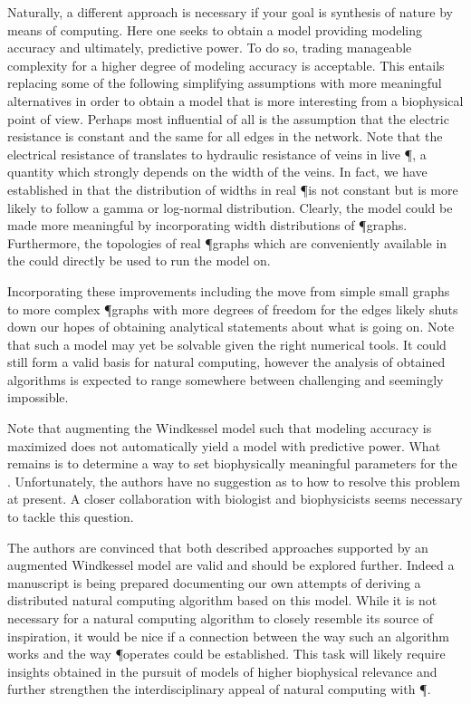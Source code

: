 	Naturally, a different approach is necessary if your goal is synthesis of nature by means of computing. Here one seeks to obtain a model providing modeling accuracy and ultimately, predictive power. To do so, trading manageable complexity for a higher degree of modeling accuracy is acceptable. This entails replacing some of the following simplifying assumptions with more meaningful alternatives in order to obtain a model that is more interesting from a biophysical point of view. Perhaps most influential of all is the assumption that the electric resistance is constant and the same for all edges in the network. Note that the electrical resistance of \Pes translates to hydraulic resistance of veins in live \P, a quantity which strongly depends on the width of the veins. In fact, we have established in  that the distribution of widths in real \P is not constant but is more likely to follow a gamma or log-normal distribution. Clearly, the model could be made more meaningful by incorporating width distributions of \P graphs. Furthermore, the topologies of real \P graphs which are conveniently available in the \SMGR could directly be used to run the model on.

	Incorporating these improvements including the move from simple small graphs to more complex \P graphs with more degrees of freedom for the edges likely shuts down our hopes of obtaining analytical statements about what is going on. Note that such a model may yet be solvable given the right numerical tools. It could still form a valid basis for natural computing, however the analysis of obtained algorithms is expected to range somewhere between challenging and seemingly impossible.

	Note that augmenting the Windkessel model such that modeling accuracy is maximized does not automatically yield a model with predictive power. What remains is to determine a way to set biophysically meaningful parameters for the \Pes. Unfortunately, the authors have no suggestion as to how to resolve this problem at present. A closer collaboration with biologist and biophysicists seems necessary to tackle this question.

	The authors are convinced that both described approaches supported by an augmented Windkessel model are valid and should be explored further. Indeed a manuscript is being prepared documenting our own attempts of deriving a distributed natural computing algorithm based on this model. While it is not necessary for a natural computing algorithm to closely resemble its source of inspiration, it would be nice if a connection between the way such an algorithm works and the way \P operates could be established. This task will likely require insights obtained in the pursuit of models of higher biophysical relevance and further strengthen the interdisciplinary appeal of natural computing with \P.
